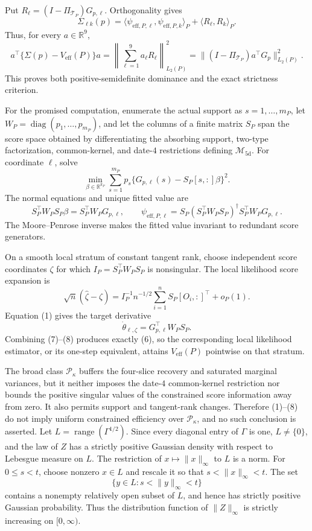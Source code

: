Put \(R_\ell=(I-\Pi_{\mathcal T_P})G_{p,\ell}\).  Orthogonality gives
\[
 \Sigma_{\ell k}(p)
 =\langle\psi_{\mathrm{eff},P,\ell},\psi_{\mathrm{eff},P,k}\rangle_P
  +\langle R_\ell,R_k\rangle_P.                            \tag{3}
\]
Thus, for every \(a\in\mathbb R^9\),
\[
 a^\top\{\Sigma(p)-V_{\mathrm{eff}}(P)\}a
 =\left\|\sum_{\ell=1}^9a_\ell R_\ell\right\|_{L_2(P)}^2
 =\|(I-\Pi_{\mathcal T_P})a^\top G_p\|_{L_2(P)}^2.        \tag{4}
\]
This proves both positive-semidefinite dominance and the exact strictness criterion.

For the promised computation, enumerate the actual support as \(s=1,\ldots,m_P\), let \(W_P=\operatorname{diag}(p_1,\ldots,p_{m_P})\), and let the columns of a finite matrix \(S_P\) span the score space obtained by differentiating the absorbing support, two-type factorization, common-kernel, and date-\(4\) restrictions defining \(\mathcal M_{\mathrm{5d}}\).  For coordinate \(\ell\), solve
\[
 \min_{\beta\in\mathbb R^{k_P}}
 \sum_{s=1}^{m_P}p_s\{G_{p,\ell}(s)-S_P[s,:]\beta\}^2.     \tag{5}
\]
The normal equations and unique fitted value are
\[
 S_P^\top W_PS_P\beta=S_P^\top W_PG_{p,\ell},
 \qquad
 \psi_{\mathrm{eff},P,\ell}
 =S_P(S_P^\top W_PS_P)^\dagger S_P^\top W_PG_{p,\ell}.     \tag{6}
\]
The Moore--Penrose inverse makes the fitted value invariant to redundant score generators.

On a smooth local stratum of constant tangent rank, choose independent score coordinates \(\zeta\) for which \(I_P=S_P^\top W_PS_P\) is nonsingular.  The local likelihood score expansion is
\[
 \sqrt n(\widehat\zeta-\zeta)
 =I_P^{-1}n^{-1/2}\sum_{i=1}^nS_P[O_i,:]^\top+o_P(1).       \tag{7}
\]
Equation (1) gives the target derivative
\[
 \dot\theta_{\ell,\zeta}=G_{p,\ell}^\top W_PS_P.           \tag{8}
\]
Combining (7)--(8) produces exactly (6), so the corresponding local likelihood estimator, or its one-step equivalent, attains \(V_{\mathrm{eff}}(P)\) pointwise on that stratum.

The broad class \(\mathcal P_\kappa\) buffers the four-slice recovery and saturated marginal variances, but it neither imposes the date-\(4\) common-kernel restriction nor bounds the positive singular values of the constrained score information away from zero.  It also permits support and tangent-rank changes.  Therefore (1)--(8) do not imply uniform constrained efficiency over \(\mathcal P_\kappa\), and no such conclusion is asserted.
Let \(L=\operatorname{range}(\Gamma^{1/2})\).  Since every diagonal entry of \(\Gamma\) is one, \(L\neq\{0\}\), and the law of \(Z\) has a strictly positive Gaussian density with respect to Lebesgue measure on \(L\).  The restriction of \(x\mapsto\|x\|_\infty\) to \(L\) is a norm.  For \(0\leq s<t\), choose nonzero \(x\in L\) and rescale it so that \(s<\|x\|_\infty<t\).  The set
\[
 \{y\in L:s<\|y\|_\infty<t\}
\]
contains a nonempty relatively open subset of \(L\), and hence has strictly positive Gaussian probability.  Thus the distribution function of \(\|Z\|_\infty\) is strictly increasing on \([0,\infty)\).

